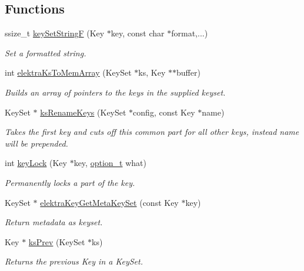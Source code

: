 \subsection*{Functions}
\begin{DoxyCompactItemize}
\item 
ssize\+\_\+t \hyperlink{group__api_ga812eb6c4f506dafa5733bf531c52199c}{key\+Set\+StringF} (Key $\ast$key, const char $\ast$format,...)
\begin{DoxyCompactList}\small\item\em Set a formatted string. \end{DoxyCompactList}\item 
int \hyperlink{group__api_gac3e995819383f904369c260f212125f5}{elektra\+Ks\+To\+Mem\+Array} (Key\+Set $\ast$ks, Key $\ast$$\ast$buffer)
\begin{DoxyCompactList}\small\item\em Builds an array of pointers to the keys in the supplied keyset. \end{DoxyCompactList}\item 
Key\+Set $\ast$ \hyperlink{group__api_ga7557d07db07649b9d81e6da63ce59376}{ks\+Rename\+Keys} (Key\+Set $\ast$config, const Key $\ast$name)
\begin{DoxyCompactList}\small\item\em Takes the first key and cuts off this common part for all other keys, instead name will be prepended. \end{DoxyCompactList}\item 
int \hyperlink{group__api_ga2dd8d2650e59a90e933c631267bfbb85}{key\+Lock} (Key $\ast$key, \hyperlink{group__keyset_ga98a3d6a4016c9dad9cbd1a99a9c2a45a}{option\+\_\+t} what)
\begin{DoxyCompactList}\small\item\em Permanently locks a part of the key. \end{DoxyCompactList}\item 
Key\+Set $\ast$ \hyperlink{group__api_ga48120f254e09e0c5cceff4864f110ceb}{elektra\+Key\+Get\+Meta\+Key\+Set} (const Key $\ast$key)
\begin{DoxyCompactList}\small\item\em Return metadata as keyset. \end{DoxyCompactList}\item 
Key $\ast$ \hyperlink{group__api_gae7d268f13dd89a6e126b3718b117996f}{ks\+Prev} (Key\+Set $\ast$ks)
\begin{DoxyCompactList}\small\item\em Returns the previous Key in a Key\+Set. \end{DoxyCompactList}\item 
$$
\end{DoxyCompactItemize}
